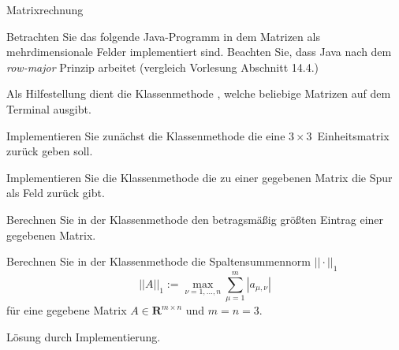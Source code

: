 \begin{exercise}{Matrixrechnung}
\begin{body}
Betrachten Sie das folgende Java-Programm in dem Matrizen als mehrdimensionale Felder implementiert sind.
Beachten Sie, dass Java nach dem \emph{row-major} Prinzip arbeitet (vergleich Vorlesung Abschnitt 14.4.)
\medskip


Als Hilfestellung dient die Klassenmethode , welche beliebige Matrizen auf dem Terminal ausgibt.
\begin{parts}
\item Implementieren Sie zun\"achst die Klassenmethode  die eine $3\times 3$~Einheitsmatrix zur\"uck geben soll.
\item Implementieren Sie die Klassenmethode  die zu einer gegebenen Matrix die Spur als Feld zur\"uck gibt.
\item Berechnen Sie in der Klassenmethode  den betragsm\"a\ss ig gr\"o\ss ten Eintrag einer gegebenen Matrix.
\item Berechnen Sie in der Klassenmethode  die Spaltensummennorm $||\cdot||_1$  $$||A||_1 := \max_{\nu=1,\ldots,n} \sum_{\mu=1}^m |a_{\mu,\nu}| $$ f\"ur eine gegebene Matrix $A\in\mathbf{R}^{m\times n}$ und $m=n=3$.
\end{parts}
\end{body}

\begin{solution}
L\"osung durch Implementierung.
\end{solution}
\end{exercise}
